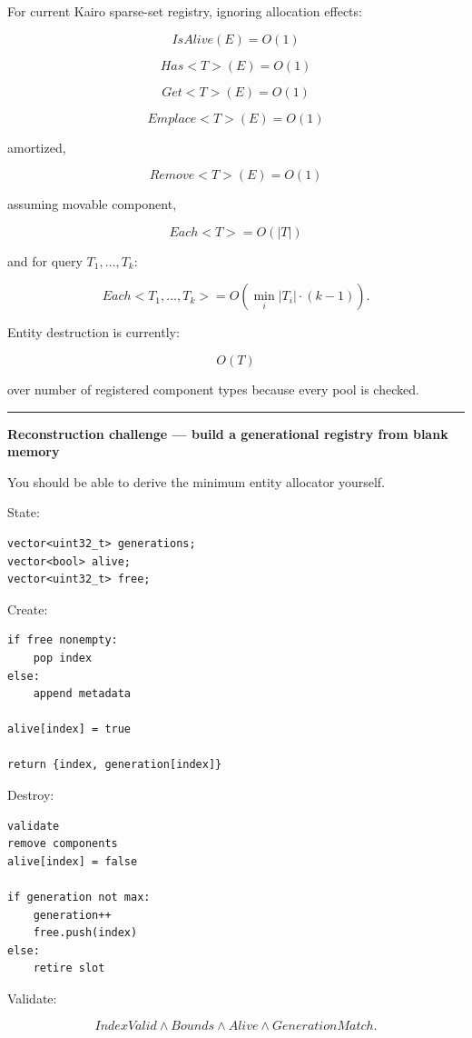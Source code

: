 For current Kairo sparse-set registry, ignoring allocation effects:

\[
IsAlive(E)=O(1)
\]

\[
Has<T>(E)=O(1)
\]

\[
Get<T>(E)=O(1)
\]

\[
Emplace<T>(E)=O(1)
\]

amortized,

\[
Remove<T>(E)=O(1)
\]

assuming movable component,

\[
Each<T>=O(|T|)
\]

and for query \(T_1,\dots,T_k\):

\[
Each<T_1,\dots,T_k>
=
O(
\min_i|T_i|
\cdot(k-1)
).
\]

Entity destruction is currently:

\[
O(T)
\]

over number of registered component types because every pool is checked.

\begin{center}\rule{0.5\linewidth}{0.5pt}\end{center}

\textbf{Reconstruction challenge --- build a generational registry from blank memory}

You should be able to derive the minimum entity allocator yourself.

State:

\begin{verbatim}
vector<uint32_t> generations;
vector<bool> alive;
vector<uint32_t> free;
\end{verbatim}

Create:

\begin{verbatim}
if free nonempty:
    pop index
else:
    append metadata

alive[index] = true

return {index, generation[index]}
\end{verbatim}

Destroy:

\begin{verbatim}
validate
remove components
alive[index] = false

if generation not max:
    generation++
    free.push(index)
else:
    retire slot
\end{verbatim}

Validate:

\[
IndexValid
\land
Bounds
\land
Alive
\land
GenerationMatch.
\]

